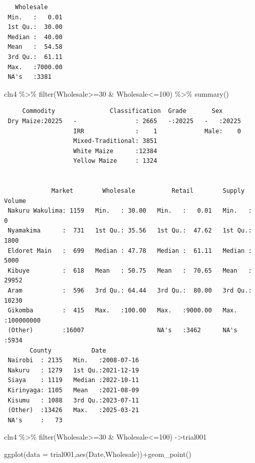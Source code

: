 \documentclass[
  letterpaper,
  DIV=11,
  numbers=noendperiod]{scrartcl}
\newenvironment{Shaded}{\begin{snugshade}}{\end{snugshade}}
\newcommand{\AttributeTok}[1]{\textcolor[rgb]{0.40,0.45,0.13}{#1}}
\newcommand{\DecValTok}[1]{\textcolor[rgb]{0.68,0.00,0.00}{#1}}
\newcommand{\FunctionTok}[1]{\textcolor[rgb]{0.28,0.35,0.67}{#1}}
\newcommand{\NormalTok}[1]{\textcolor[rgb]{0.00,0.23,0.31}{#1}}
\newcommand{\OtherTok}[1]{\textcolor[rgb]{0.00,0.23,0.31}{#1}}
\newcommand{\SpecialCharTok}[1]{\textcolor[rgb]{0.37,0.37,0.37}{#1}}
\begin{document}
\begin{verbatim}
   Wholesale      
 Min.   :   0.01  
 1st Qu.:  30.00  
 Median :  40.00  
 Mean   :  54.58  
 3rd Qu.:  61.11  
 Max.   :7000.00  
 NA's   :3381     
\end{verbatim}

\begin{Shaded}
\begin{Highlighting}[]
\NormalTok{cln4 }\SpecialCharTok{\%\textgreater{}\%} \FunctionTok{filter}\NormalTok{(Wholesale}\SpecialCharTok{\textgreater{}=}\DecValTok{30} \SpecialCharTok{\&}\NormalTok{ Wholesale}\SpecialCharTok{\textless{}=}\DecValTok{100}\NormalTok{) }\SpecialCharTok{\%\textgreater{}\%} \FunctionTok{summary}\NormalTok{()}
\end{Highlighting}
\end{Shaded}

\begin{verbatim}
     Commodity               Classification  Grade       Sex       
 Dry Maize:20225   -                : 2665   -:20225   -   :20225  
                   IRR              :    1             Male:    0  
                   Mixed-Traditional: 3851                         
                   White Maize      :12384                         
                   Yellow Maize     : 1324                         
                                                                   
                                                                   
             Market        Wholesale          Retail        Supply Volume      
 Nakuru Wakulima: 1159   Min.   : 30.00   Min.   :   0.01   Min.   :        0  
 Nyamakima      :  731   1st Qu.: 35.56   1st Qu.:  47.62   1st Qu.:     1800  
 Eldoret Main   :  699   Median : 47.78   Median :  61.11   Median :     5000  
 Kibuye         :  618   Mean   : 50.75   Mean   :  70.65   Mean   :    29952  
 Aram           :  596   3rd Qu.: 64.44   3rd Qu.:  80.00   3rd Qu.:    10230  
 Gikomba        :  415   Max.   :100.00   Max.   :9000.00   Max.   :100000000  
 (Other)        :16007                    NA's   :3462      NA's   :5934       
       County           Date           
 Nairobi  : 2135   Min.   :2008-07-16  
 Nakuru   : 1279   1st Qu.:2021-12-19  
 Siaya    : 1119   Median :2022-10-11  
 Kirinyaga: 1105   Mean   :2021-08-09  
 Kisumu   : 1088   3rd Qu.:2023-07-11  
 (Other)  :13426   Max.   :2025-03-21  
 NA's     :   73                       
\end{verbatim}

\begin{Shaded}
\begin{Highlighting}[]
\NormalTok{cln4 }\SpecialCharTok{\%\textgreater{}\%} \FunctionTok{filter}\NormalTok{(Wholesale}\SpecialCharTok{\textgreater{}=}\DecValTok{30} \SpecialCharTok{\&}\NormalTok{ Wholesale}\SpecialCharTok{\textless{}=}\DecValTok{100}\NormalTok{) }\OtherTok{{-}\textgreater{}}\NormalTok{trial001}

\FunctionTok{ggplot}\NormalTok{(}\AttributeTok{data =}\NormalTok{ trial001,}\FunctionTok{aes}\NormalTok{(Date,Wholesale))}\SpecialCharTok{+}\FunctionTok{geom\_point}\NormalTok{()}
\end{Highlighting}
\end{Shaded}
\end{document}
